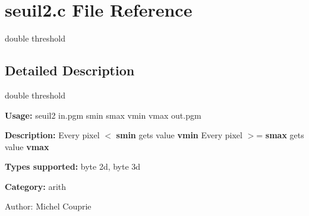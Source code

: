 \section{seuil2.c File Reference}
\label{seuil2_8c}
double threshold 



\subsection{Detailed Description}
double threshold 

{\bf Usage:} seuil2 in.pgm smin smax vmin vmax out.pgm

{\bf Description:} Every pixel $<$ {\bf smin} gets value {\bf vmin} Every pixel $>$= {\bf smax} gets value {\bf vmax} 

{\bf Types supported:} byte 2d, byte 3d

{\bf Category:} arith

\begin{Desc}
\item[Author:]Michel Couprie \end{Desc}
